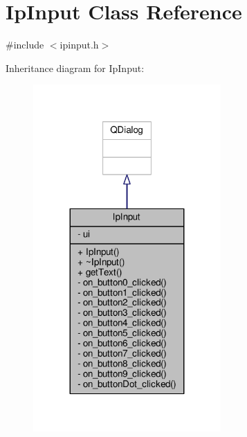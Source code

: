 \hypertarget{classIpInput}{}\section{Ip\+Input Class Reference}
\label{classIpInput}


{\ttfamily \#include $<$ipinput.\+h$>$}



Inheritance diagram for Ip\+Input\+:
\nopagebreak
\begin{figure}[H]
\begin{center}
\leavevmode
\includegraphics[width=203pt]{classIpInput__inherit__graph}
\end{center}
\end{figure}


